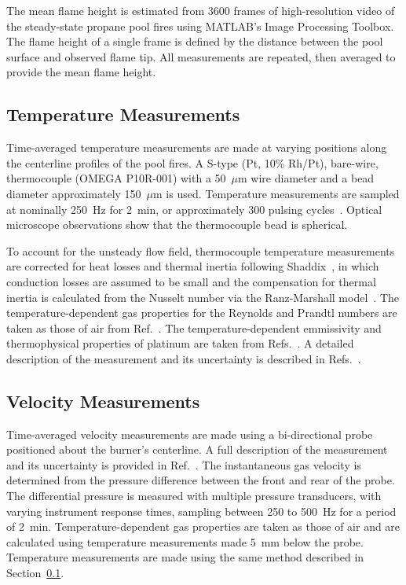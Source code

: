 \documentclass[12pt]{ussci}
\begin{document}
The mean flame height is estimated from 3600 frames of high-resolution video of the steady-state propane pool fires using MATLAB's Image Processing Toolbox. The flame height of a single frame is defined by the distance between the pool surface and observed flame tip. All measurements are repeated, then averaged to provide the mean flame height. 

\subsection{Temperature Measurements}\label{ssec:Temp_Meas}
Time-averaged temperature measurements are made at varying positions along the centerline profiles of the pool fires. A S-type (Pt, 10\% Rh/Pt), bare-wire, thermocouple (OMEGA P10R-001) with a 50~$\mu$m wire diameter and a bead diameter approximately 150~$\mu$m is used. Temperature measurements are sampled at nominally 250~Hz for 2~min, or approximately 300 pulsing cycles~\cite{Falkenstein2021a}. Optical microscope observations show that the thermocouple bead is spherical. 

To account for the unsteady flow field, thermocouple temperature measurements are corrected for heat losses and thermal inertia following Shaddix~\cite{Shaddix2001}, in which conduction losses are assumed to be small and the compensation for thermal inertia is calculated from the Nusselt number via the Ranz-Marshall model~\cite{Shaddix1999}. The temperature-dependent gas properties for the Reynolds and Prandtl numbers are taken as those of air from Ref.~\cite{Incropera2011}.  The temperature-dependent emmissivity and thermophysical properties of platinum are taken from Refs.~\cite{Platinum2010, Jaeger1939}. A detailed description of the measurement and its uncertainty is described in Refs.~\cite{Sung2020}. 

\subsection{Velocity Measurements}
Time-averaged velocity measurements are made using a bi-directional probe positioned about the burner's centerline. A full description of the measurement and its uncertainty is provided in Ref.~\cite{Sung2021}. The instantaneous gas velocity is determined from the pressure difference between the front and rear of the probe. The differential pressure is measured with multiple pressure transducers, with varying instrument response times, sampling between 250 to 500~Hz for a period of 2~min. Temperature-dependent gas properties are taken as those of air and are calculated using temperature measurements made 5~mm below the probe. Temperature measurements are made using the same method described in Section~\ref{ssec:Temp_Meas}. 
\end{document}
